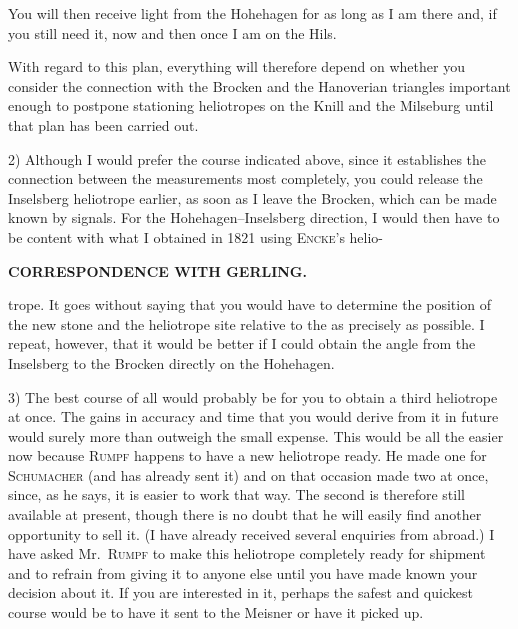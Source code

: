 You will then receive light from the Hohehagen  for as long as I am there and, if you still need it, now and then once I am on the Hils.
\par\noindent\hspace*{\parindent}With regard to this plan, everything will therefore depend on whether you consider the connection with the Brocken and the Hanoverian triangles important enough to postpone stationing heliotropes on the Knill and the Milseburg until that plan has been carried out.
\par\noindent\hspace*{\parindent}2) Although I would prefer the course indicated above, since it establishes the connection between the measurements most completely, you could  release the Inselsberg heliotrope earlier, as soon as I leave the Brocken, which can be made known by signals.
For the Hohehagen–Inselsberg direction, I would then have to be content with what I obtained in 1821 using \textsc{Encke}'s helio-
\par\clearpage
\noindent{}\hfill{\small\textbf{CORRESPONDENCE WITH GERLING.}}\hfill\null\par\medskip
\noindent trope.
It goes without saying that you would have to determine the position of the new stone and the heliotrope site relative to the  as precisely as possible.
I repeat, however, that it would be better if I could obtain the angle from the Inselsberg to the Brocken directly on the Hohehagen.
\par\noindent\hspace*{\parindent}3) The best course of all would probably be for you to obtain a third heliotrope at once.
The gains in accuracy and time that you would derive from it in future would surely more than outweigh the small expense.
This would be all the easier now because \textsc{Rumpf} happens to have a new heliotrope ready.
He made one for \textsc{Schumacher} (and has already sent it) and on that occasion made two at once, since, as he says, it is easier to work that way.
The second is therefore still available at present, though there is no doubt that he will easily find another opportunity to sell it.
(I have already received several enquiries from abroad.)
I have asked Mr.~\textsc{Rumpf} to make this heliotrope completely ready for shipment and to refrain from giving it to anyone else until you have made known your decision about it.
If you are interested in it, perhaps the safest and quickest course would be to have it sent to the Meisner or have it picked up.
